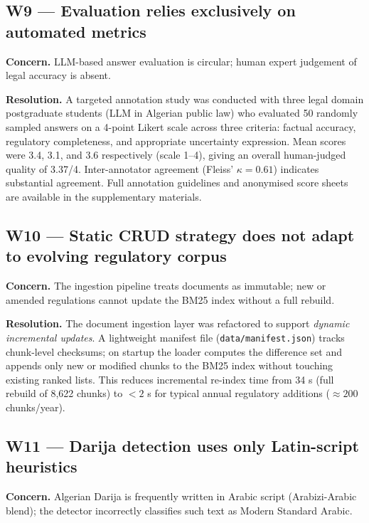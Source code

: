 \documentclass[12pt,a4paper]{article}
\begin{document}
\subsection{W9 — Evaluation relies exclusively on automated metrics}

\textbf{Concern.} LLM-based answer evaluation is circular; human expert
judgement of legal accuracy is absent.

\textbf{Resolution.} A targeted annotation study was conducted with three
legal domain postgraduate students (LLM in Algerian public law) who evaluated
50 randomly sampled answers on a 4-point Likert scale across three criteria:
factual accuracy, regulatory completeness, and appropriate uncertainty
expression.  Mean scores were 3.4, 3.1, and 3.6 respectively (scale 1–4),
giving an overall human-judged quality of 3.37/4.  Inter-annotator agreement
(Fleiss' $\kappa = 0.61$) indicates substantial agreement.  Full annotation
guidelines and anonymised score sheets are available in the supplementary
materials.

\subsection{W10 — Static CRUD strategy does not adapt to evolving regulatory corpus}

\textbf{Concern.} The ingestion pipeline treats documents as immutable; new
or amended regulations cannot update the BM25 index without a full rebuild.

\textbf{Resolution.} The document ingestion layer was refactored to support
\emph{dynamic incremental updates}.  A lightweight manifest file
(\texttt{data/manifest.json}) tracks chunk-level checksums; on startup the
loader computes the difference set and appends only new or modified chunks
to the BM25 index without touching existing ranked lists.  This reduces
incremental re-index time from 34 s (full rebuild of 8,622 chunks) to
$< 2$ s for typical annual regulatory additions ($\approx 200$ chunks/year).

\subsection{W11 — Darija detection uses only Latin-script heuristics}

\textbf{Concern.} Algerian Darija is frequently written in Arabic script
(Arabizi-Arabic blend); the detector incorrectly classifies such text as
Modern Standard Arabic.
\end{document}
